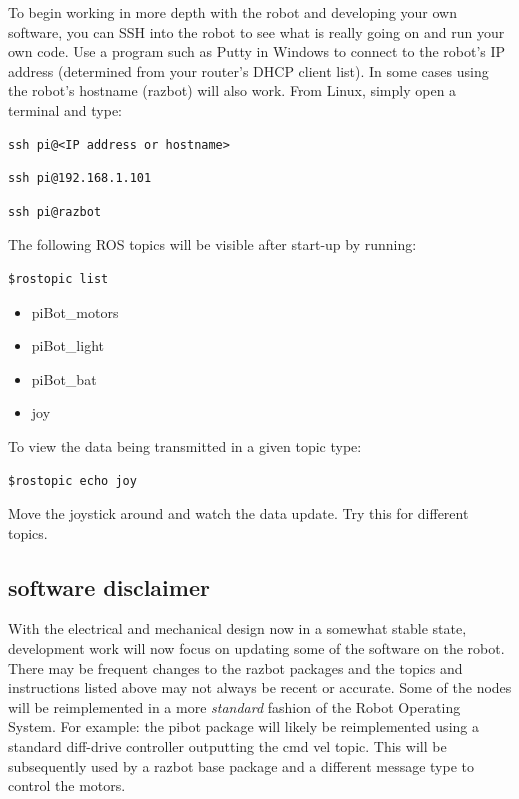\documentclass[12pt,titlepage,oneside]{memoir}
\begin{document}
To begin working in more depth with the robot and developing your own software, you can SSH into the robot to see what is really going on and run your own code. Use a program such as Putty in Windows to connect to the robot's IP address (determined from your router's DHCP client list). In some cases using the robot's hostname (razbot) will also work. From Linux, simply open a terminal and type:

\begin{verbatim}
ssh pi@<IP address or hostname>
\end{verbatim}

\begin{verbatim}
ssh pi@192.168.1.101
\end{verbatim}

\begin{verbatim}
ssh pi@razbot
\end{verbatim}

The following ROS topics will be visible after start-up by running:
\begin{verbatim}
$rostopic list
\end{verbatim}

\begin{itemize}
\item piBot{\_}motors
\item piBot{\_}light
\item piBot{\_}bat
\item joy
\end{itemize}

To view the data being transmitted in a given topic type:
\begin{verbatim}
$rostopic echo joy
\end{verbatim}
Move the joystick around and watch the data update. Try this for different topics.

\subsection{software disclaimer}
With the electrical and mechanical design now in a somewhat stable state, development work will now focus on updating some of the software on the robot. There may be frequent changes to the razbot packages and the topics and instructions listed above may not always be recent or accurate. Some of the nodes will be reimplemented in a more \textit{standard} fashion of the Robot Operating System. For example: the pibot package will likely be reimplemented using a standard diff-drive controller outputting the cmd vel topic. This will be subsequently used by a razbot base package and a different message type to control the motors.
\end{document}
